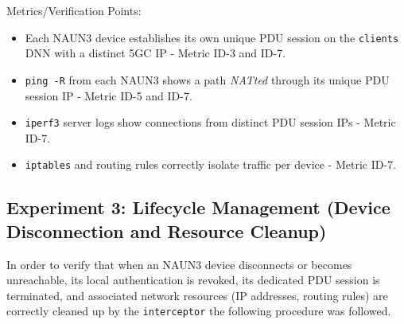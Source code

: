Metrics/Verification Points:
\begin{itemize}
    \item Each \ac{NAUN3} device establishes its own unique \ac{PDU} session on the \texttt{clients} \ac{DNN} with a distinct \ac{5GC} \ac{IP} - Metric ID-3 and ID-7.
    
    \item \texttt{ping -R} from each \ac{NAUN3} shows a path \textit{NATted} through its unique \ac{PDU} session \ac{IP} - Metric ID-5 and ID-7.
    
    \item \texttt{iperf3} server logs show connections from distinct \ac{PDU} session \acp{IP} - Metric ID-7.
    
    \item \texttt{iptables} and routing rules correctly isolate traffic per device - Metric ID-7.
\end{itemize}

\subsection{Experiment 3: Lifecycle Management (Device Disconnection and Resource Cleanup)}

In order to verify that when an \ac{NAUN3} device disconnects or becomes unreachable, its local authentication is revoked, its dedicated \ac{PDU} session is terminated, and associated network resources (\ac{IP} addresses, routing rules) are correctly cleaned up by the \texttt{interceptor} the following procedure was followed.

